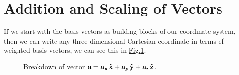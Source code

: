 \documentclass[letterpaper,10pt,english]{jupyterBook}
\begin{document}
\section{Addition and Scaling of Vectors}
\label{\detokenize{VectorCalculus/vectoralgebra:addition-and-scaling-of-vectors}}
\sphinxAtStartPar
If we start with the basis vectors as building blocks of our coordinate system, then we can write any three dimensional Cartesian coordinate in terms of
weighted basis vectors, we can see this in \hyperref[\detokenize{VectorCalculus/vectoralgebra:basisvectors}]{Fig.\@ \ref{\detokenize{VectorCalculus/vectoralgebra:basisvectors}}}.

\begin{figure}[htbp]
\centering
\capstart

\noindent{}
\caption{Breakdown of vector \(\bf a = a_x \,\hat{\bf x} + a_y \,\hat{\bf y} + a_z \,\hat{\bf z}\).}\label{\detokenize{VectorCalculus/vectoralgebra:basisvectors}}\end{figure}
\end{document}
